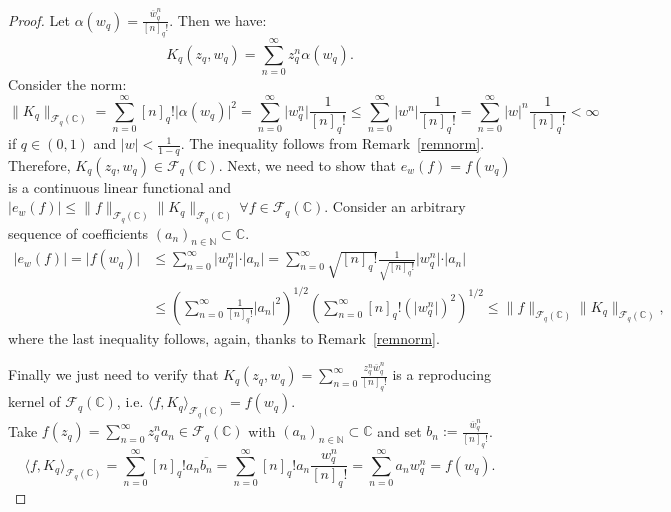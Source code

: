 \documentclass[10pt,a4paper]{amsart}
\renewcommand{\bar}[1]{\overline{#1}}
\begin{document}
\begin{proof}
Let $\alpha(w_{q}) = \frac{\bar{w}_q^n}{[n]_q!}$. Then we have:
$$K_q(z_{q},w_{q}) = \sum_{n=0}^{\infty} z_q^n\alpha(w_{q}).$$
Consider the norm:
$$\lVert K_q \rVert_{\mathcal{F}_q(\mathbb{C})} = \sum_{n=0}^{\infty} [n]_q! \vert \alpha(w_{q}) \vert^2 = \sum_{n=0}^{\infty} \vert w_q^n\vert \frac{1}{[n]_q!} \leq \sum_{n=0}^\infty \vert w^n\vert\frac{1}{[n]_q!} = \sum_{n=0}^\infty \vert w \vert^n\frac{1}{[n]_q!} <\infty$$
if $q\in (0,1)$ and $\vert w \vert <\frac{1}{1-q}$. 
The inequality follows from Remark~\ref{remnorm}.
Therefore, $K_q(z_{q},w_{q}) \in \mathcal{F}_q(\mathbb{C})$.
Next, we need to show that $e_w(f) = f(w_{q})$ is a continuous linear functional and $\vert e_w(f)\vert \leq \lVert f \rVert_{\mathcal{F}_q(\mathbb{C})} \lVert K_q \rVert_{\mathcal{F}_q(\mathbb{C})} \, \forall f\in \mathcal{F}_q(\mathbb{C})$. Consider an arbitrary sequence of coefficients $(a_n)_{n\in\mathbb{N}} \subset \mathbb{C}$.
\begin{align*}
\vert e_w(f) \vert = \vert f(w_{q}) \vert &\leq \sum_{n=0}^{\infty} \vert w_q^n\vert \cdot \vert a_n \vert= \sum_{n=0}^{\infty} \sqrt{[n]_q!}\frac{1}{\sqrt{[n]_q!}}\vert w_q^n\vert\cdot \vert a_n\vert\\
&\leq \left( \sum_{n=0}^{\infty} \frac{1}{[n]_q!}\vert a_n \vert^2\right)^{1/2}\left(\sum_{n=0}^{\infty} [n]_q! (\vert w_q^n \vert)^2\right)^{1/2}\leq \lVert f \rVert_{\mathcal{F}_q(\mathbb{C})} \lVert K_q \rVert_{\mathcal{F}_q(\mathbb{C})},
\end{align*}
where the last inequality follows, again, thanks to Remark~\ref{remnorm}.

Finally we just need to verify that $K_q(z_{q},w_{q}) = \sum_{n=0}^{\infty} \frac{z_q^n\bar{w}_q^n}{[n]_q!}$ is a reproducing kernel of $\mathcal{F}_q(\mathbb{C})$, i.e. $\langle f, K_q \rangle_{\mathcal{F}_q(\mathbb{C})} = f(w_{q})$.\\
Take $f(z_{q}) = \sum_{n=0}^{\infty} z_q^n a_n \in \mathcal{F}_q(\mathbb{C})$ with $(a_n)_{n\in\mathbb{N}} \subset\mathbb{C}$ and set $b_n := \frac{\bar{w}_q^n}{[n]_q!}$.
$$
\langle f,K_q \rangle_{\mathcal{F}_q(\mathbb{C})} = \sum_{n=0}^{\infty} [n]_q! a_n\bar{b_n}= \sum_{n=0}^{\infty} [n]_q! a_n \frac{w_q^n}{[n]_q!}= \sum_{n=0}^{\infty} a_n w_q^n = f(w_{q}).
$$
\end{proof}
\end{document}
